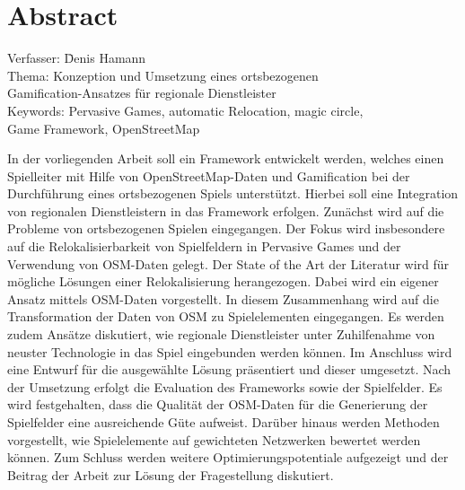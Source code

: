 \chapter*{Abstract}
\label{ch0:abstract}

\begin{tabbing}
Verfasser:	 \hspace{20mm} \= Denis Hamann\\
Thema:	  \> Konzeption und Umsetzung eines ortsbezogenen\\
		\> Gamification-Ansatzes für regionale Dienstleister\\
Keywords: \> Pervasive Games, automatic Relocation, magic circle,\\
		\> Game Framework, OpenStreetMap
\end{tabbing}
\vspace{1cm}
In der vorliegenden Arbeit soll ein Framework entwickelt werden, welches einen Spielleiter mit Hilfe von OpenStreetMap-Daten und Gamification bei der Durchführung eines ortsbezogenen Spiels unterstützt. Hierbei soll eine Integration von regionalen Dienstleistern in das Framework erfolgen.
Zunächst wird auf die Probleme von ortsbezogenen Spielen eingegangen.
Der Fokus wird insbesondere auf die Relokalisierbarkeit von Spielfeldern in Pervasive Games und der Verwendung von OSM-Daten gelegt. Der State of the Art der Literatur wird für mögliche Lösungen einer Relokalisierung herangezogen. Dabei wird ein eigener Ansatz mittels OSM-Daten vorgestellt. In diesem Zusammenhang wird auf die Transformation der Daten von OSM zu Spielelementen eingegangen.
Es werden zudem Ansätze diskutiert, wie regionale Dienstleister unter Zuhilfenahme von neuster Technologie in das Spiel eingebunden werden können.
Im Anschluss wird eine Entwurf für die ausgewählte Lösung präsentiert und dieser umgesetzt. Nach der Umsetzung erfolgt die Evaluation des Frameworks sowie der Spielfelder. Es wird festgehalten, dass die Qualität der OSM-Daten für die Generierung der Spielfelder eine ausreichende Güte aufweist. Darüber hinaus werden Methoden vorgestellt, wie Spielelemente auf gewichteten Netzwerken bewertet werden können. Zum Schluss werden weitere Optimierungspotentiale aufgezeigt und der Beitrag der Arbeit zur Lösung der Fragestellung diskutiert.
